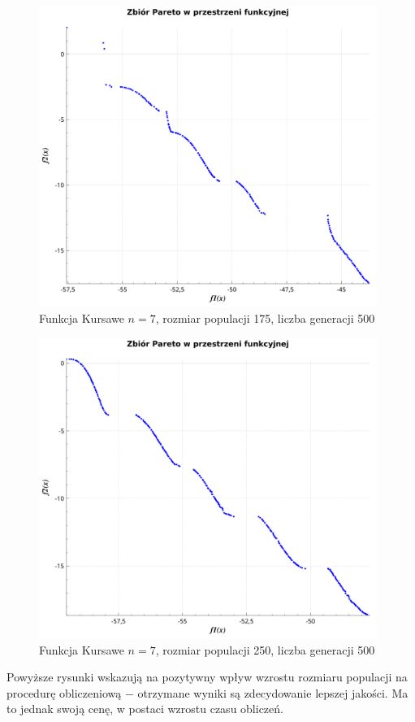 \documentclass[11pt,a4paper]{article}
\begin{document}
\begin{figure}[H]
\centering
\includegraphics[width=11cm]{kur_N_175}
\caption{Funkcja Kursawe $n = 7$, rozmiar populacji 175, liczba generacji 500}
\label{fig:kur_N_175}
\end{figure}

\begin{figure}[H]
\centering
\includegraphics[width=11cm]{kur_N_250}
\caption{Funkcja Kursawe $n = 7$, rozmiar populacji 250, liczba generacji 500}
\label{fig:kur_N_250}
\end{figure}

Powyższe rysunki wskazują na pozytywny wpływ wzrostu rozmiaru populacji na procedurę obliczeniową $-$ otrzymane wyniki są zdecydowanie lepszej jakości. Ma to jednak swoją cenę, w postaci wzrostu czasu obliczeń. 
\end{document}
